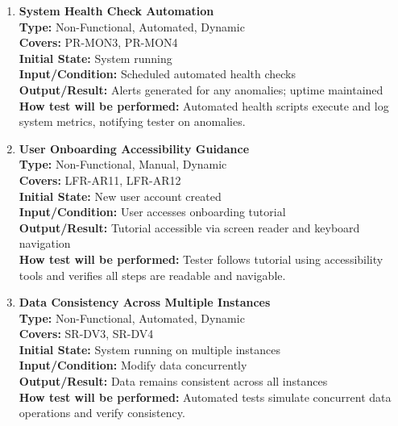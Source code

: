 \documentclass[12pt, titlepage]{article}
\begin{document}
\begin{enumerate}[label=NFR-ST \arabic*., wide=0pt, leftmargin=*]
  \item \textbf{System Health Check Automation} \\[2mm]
    \textbf{Type:} Non-Functional, Automated, Dynamic \\
    \textbf{Covers:} PR-MON3, PR-MON4 \\
    \textbf{Initial State:} System running \\
    \textbf{Input/Condition:} Scheduled automated health checks \\
    \textbf{Output/Result:} Alerts generated for any anomalies;
    uptime maintained \\[2mm]
    \textbf{How test will be performed:} Automated health scripts
    execute and log system metrics, notifying tester on anomalies.

  \item \textbf{User Onboarding Accessibility Guidance} \\[2mm]
    \textbf{Type:} Non-Functional, Manual, Dynamic \\
    \textbf{Covers:} LFR-AR11, LFR-AR12 \\
    \textbf{Initial State:} New user account created \\
    \textbf{Input/Condition:} User accesses onboarding tutorial \\
    \textbf{Output/Result:} Tutorial accessible via screen reader and
    keyboard navigation \\[2mm]
    \textbf{How test will be performed:} Tester follows tutorial
    using accessibility tools and verifies all steps are readable and navigable.

  \item \textbf{Data Consistency Across Multiple Instances} \\[2mm]
    \textbf{Type:} Non-Functional, Automated, Dynamic \\
    \textbf{Covers:} SR-DV3, SR-DV4 \\
    \textbf{Initial State:} System running on multiple instances \\
    \textbf{Input/Condition:} Modify data concurrently \\
    \textbf{Output/Result:} Data remains consistent across all instances \\[2mm]
    \textbf{How test will be performed:} Automated tests simulate
    concurrent data operations and verify consistency.


\end{enumerate}
\end{document}
